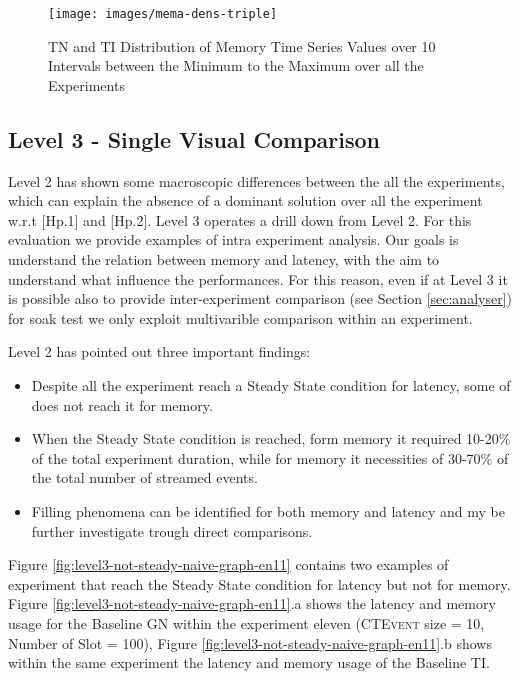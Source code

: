 \begin{figure}[hbt]
  \centering
	\texttt{[image: images/mema-dens-triple]}
	\caption{TN and TI Distribution of Memory Time Series Values over 10 Intervals between the Minimum to the Maximum over all the Experiments} 
  	\label{fig:level2-memory-density-triple}
\end{figure}

\subsection{Level 3 - Single Visual Comparison}\label{sec:eval-level3}
	
Level 2 has shown some macroscopic differences between the all the experiments, which can explain the absence of a dominant solution over all the experiment w.r.t [Hp.1] and [Hp.2]. Level 3 operates a drill down from Level 2. For this evaluation we provide examples of intra experiment analysis. Our goals is understand the relation between memory and latency, with the aim to understand what influence the performances. For this reason, even if at Level 3 it is possible also to provide inter-experiment comparison (see Section \ref{sec:analyser}) for soak test we only exploit multivarible comparison within an experiment.

Level 2 has pointed out three important findings:
\begin{itemize}
\item Despite all the experiment reach a Steady State condition for latency, some of does not reach it for memory.
\item When the Steady State condition is reached, form memory it required 10-20\% of the total experiment duration, while for memory it necessities of 30-70\% of the total number of streamed events.
\item Filling phenomena can be identified for both memory and latency and my be further investigate trough direct comparisons.
\end{itemize}

Figure \ref{fig:level3-not-steady-naive-graph-en11} contains two examples of experiment that reach the Steady State condition for latency but not for memory. Figure \ref{fig:level3-not-steady-naive-graph-en11}.a shows the latency and memory usage for the Baseline GN within the experiment eleven (\textsc{CTEvent} size = 10, Number of Slot = 100), Figure \ref{fig:level3-not-steady-naive-graph-en11}.b shows within the same experiment the latency and memory usage of the Baseline TI. 

